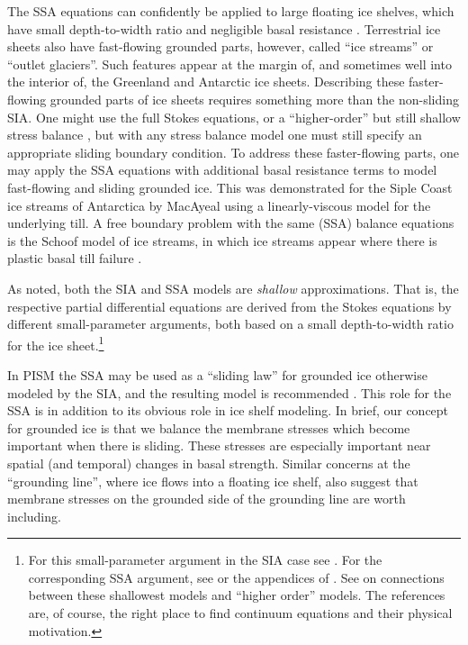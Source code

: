 \documentclass[11pt,final]{amsart}
\begin{document}
The SSA equations can confidently be applied to large floating ice shelves, which have small depth-to-width ratio and negligible basal resistance \cite{Morland,MorlandZainuddin}.  Terrestrial ice sheets also have fast-flowing grounded parts, however, called ``ice streams'' or ``outlet glaciers''.  Such features appear at the margin of, and sometimes well into the interior of, the Greenland \cite{Joughinetal2001} and Antarctic \cite{BamberVaughanJoughin} ice sheets.  Describing these faster-flowing grounded parts of ice sheets requires something more than the non-sliding SIA.  One might use the full Stokes equations, or a ``higher-order'' but still shallow stress balance \cite{Blatter,Pattyn03}, but with any stress balance model one must still specify an appropriate sliding boundary condition.  To address these faster-flowing parts, one may apply the SSA equations with additional basal resistance terms to model fast-flowing and sliding grounded ice.  This was demonstrated for the Siple Coast ice streams of Antarctica by MacAyeal \cite{MacAyeal} using a linearly-viscous model for the underlying till.  A free boundary problem with the same (SSA) balance equations is the Schoof \cite{SchoofStream} model of ice streams, in which ice streams appear where there is plastic basal till failure \cite{Paterson}.

As noted, both the SIA and SSA models are \emph{shallow} approximations.  That is, the respective partial differential equations are derived from the Stokes equations by different small-parameter arguments, both based on a small depth-to-width ratio for the ice sheet.\footnote{For this small-parameter argument in the SIA case see \cite{Fowler}.  For the corresponding SSA argument, see \cite{WeisGreveHutter} or the appendices of \cite{SchoofStream}.  See \cite{SchoofHindmarsh} on connections between these shallowest models and ``higher order'' models.  The references are, of course, the right place to find continuum equations and their physical motivation.}

In PISM the SSA may be used as a ``sliding law'' for grounded ice otherwise modeled by the SIA, and the resulting model is recommended \cite{BBssasliding,BKAJS}.  This role for the SSA is in addition to its obvious role in ice shelf modeling.  In brief, our concept for grounded ice is that we balance the membrane stresses which become important when there is sliding.  These stresses are especially important near spatial (and temporal) changes in basal strength.  Similar concerns at the ``grounding line'', where ice flows into a floating ice shelf, also suggest that membrane stresses on the grounded side of the grounding line are worth including.
\end{document}
